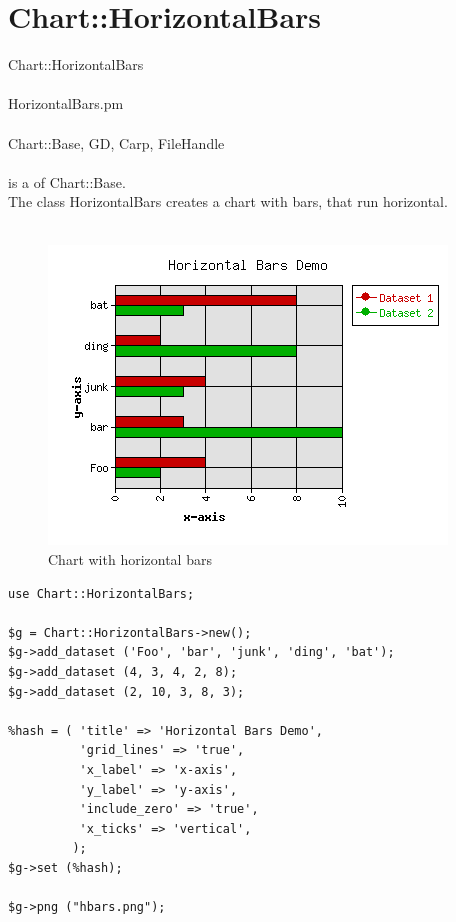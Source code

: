\section{Chart::HorizontalBars}
 Chart::HorizontalBars\\ \\
 HorizontalBars.pm\\ \\
Chart::Base, GD, Carp, FileHandle\\ \\
  is a  of Chart::Base.\\
The class HorizontalBars creates a chart with bars, that run horizontal.\\
\\
\begin{figure}[h]
	\begin{center}
		\includegraphics[scale=0.7]{d_hbars4.png}
	\end{center}
	\caption{Chart with horizontal bars}
	\label{fig:hbars}
\end{figure}
\begin{verbatim}
use Chart::HorizontalBars;

$g = Chart::HorizontalBars->new();
$g->add_dataset ('Foo', 'bar', 'junk', 'ding', 'bat');
$g->add_dataset (4, 3, 4, 2, 8);
$g->add_dataset (2, 10, 3, 8, 3);

%hash = ( 'title' => 'Horizontal Bars Demo',
          'grid_lines' => 'true',
          'x_label' => 'x-axis',
          'y_label' => 'y-axis',
          'include_zero' => 'true',
          'x_ticks' => 'vertical',
         );
$g->set (%hash);

$g->png ("hbars.png");
\end{verbatim}

